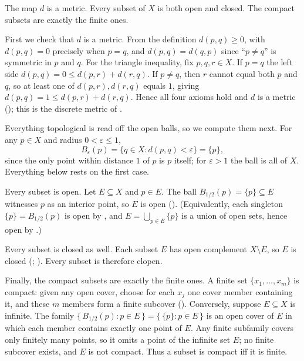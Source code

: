 \documentclass[main.tex]{subfiles}
\begin{document}
\begin{Solution}
The map $d$ is a metric. Every subset of $X$ is both open and closed. The compact subsets are exactly
the finite ones.

First we check that $d$ is a metric. From the definition $d(p,q)\ge 0$, with $d(p,q)=0$ precisely when
$p=q$, and $d(p,q)=d(q,p)$ since ``$p\neq q$'' is symmetric in $p$ and $q$. For the triangle inequality, fix
$p,q,r\in X$. If $p=q$ the left side $d(p,q)=0\le d(p,r)+d(r,q)$. If $p\neq q$, then $r$ cannot equal
both $p$ and $q$, so at least one of $d(p,r),d(r,q)$ equals $1$, giving $d(p,q)=1\le d(p,r)+d(r,q)$.
Hence all four axioms hold and $d$ is a metric (); this is the discrete metric of
.

Everything topological is read off the open balls, so we compute them next. For any $p\in X$ and radius
$0<\varepsilon\le 1$,
\[
B_\varepsilon(p)=\{q\in X:d(p,q)<\varepsilon\}=\{p\},
\]
since the only point within distance $1$ of $p$ is $p$ itself; for $\varepsilon>1$ the ball is all of
$X$. Everything below rests on the first case.

Every subset is open. Let $E\subseteq X$ and $p\in E$. The ball $B_{1/2}(p)=\{p\}\subseteq E$
witnesses $p$ as an interior point, so $E$ is open (). (Equivalently, each singleton
$\{p\}=B_{1/2}(p)$ is open by , and $E=\bigcup_{p\in E}\{p\}$
is a union of open sets, hence open by .)

Every subset is closed as well. Each subset $E$ has open complement $X\setminus E$, so $E$ is closed
(; ). Every subset is therefore
clopen.

Finally, the compact subsets are exactly the finite ones. A finite set $\{x_1,\dots,x_m\}$ is compact:
given any open cover, choose for each $x_j$ one cover member containing it, and these $m$ members form a
finite subcover (). Conversely, suppose $E\subseteq X$ is infinite. The family
$\{\,B_{1/2}(p):p\in E\,\}=\{\,\{p\}:p\in E\,\}$ is an open cover of $E$ in which each member contains
exactly one point of $E$. Any finite subfamily covers only finitely many points, so it omits a point of
the infinite set $E$; no finite subcover exists, and $E$ is not compact. Thus a subset is compact iff it
is finite.
\end{Solution}
\end{document}
